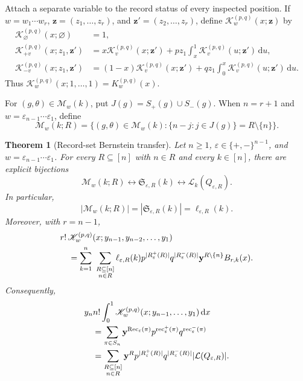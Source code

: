 \documentclass[11pt,letterpaper,reqno]{amsart}
\newtheorem{theorem}{Theorem}[section]
\theoremstyle{definition}
\DeclareMathOperator{\rec}{rec}
\newcommand{\dd}{\,\mathrm{d}}
\newcommand{\eps}{\varepsilon}
\begin{document}
Attach a separate variable to the record status of every inspected position.
If \(w=w_1\cdots w_r\), \(\mathbf z=(z_1,\ldots,z_r)\), and
\(\mathbf z'=(z_2,\ldots,z_r)\), define
\(\mathscr K_w^{(p,q)}(x;\mathbf z)\) by
\begin{align*}
\mathscr K_\varnothing^{(p,q)}(x;\varnothing)&=1,\\
\mathscr K_{+v}^{(p,q)}(x;z_1,\mathbf z')
 &=x\mathscr K_v^{(p,q)}(x;\mathbf z')
   +p z_1\int_x^1\mathscr K_v^{(p,q)}(u;\mathbf z')\dd u,\\
\mathscr K_{-v}^{(p,q)}(x;z_1,\mathbf z')
 &=(1-x)\mathscr K_v^{(p,q)}(x;\mathbf z')
   +q z_1\int_0^x\mathscr K_v^{(p,q)}(u;\mathbf z')\dd u.
\end{align*}
Thus \(\mathscr K_w^{(p,q)}(x;1,\ldots,1)=K_w^{(p,q)}(x)\).

For \((g,\theta)\in\mathcal M_w(k)\), put
\(J(g)=S_+(g)\cup S_-(g)\).  When \(n=r+1\) and
\(w=\eps_{n-1}\cdots\eps_1\), define
\[
\mathcal M_w(k;R)
 =\bigl\{(g,\theta)\in\mathcal M_w(k):
          \{n-j:j\in J(g)\}=R\setminus\{n\}\bigr\}.
\]

\begin{theorem}[Record-set Bernstein transfer]
\label{thm:record-set-master-transfer}
Let \(n\ge1\), \(\eps\in\{+,-\}^{n-1}\), and
\(w=\eps_{n-1}\cdots\eps_1\).  For every \(R\subseteq[n]\) with \(n\in R\)
and every \(k\in[n]\), there are explicit bijections
\[
\mathcal M_w(k;R)
 \longleftrightarrow \mathfrak S_{\eps,R}(k)
 \longleftrightarrow \mathcal L_k(Q_{\eps,R}).
\]
In particular,
\[
|\mathcal M_w(k;R)|
 =|\mathfrak S_{\eps,R}(k)|
 =\ell_{\eps,R}(k).
\]
Moreover, with \(r=n-1\),
\begin{align}
&r!\,\mathscr K_w^{(p,q)}
  (x;y_{n-1},y_{n-2},\ldots,y_1) \notag\\
&\quad=
\sum_{k=1}^{n}\ \sum_{\substack{R\subseteq[n]\\n\in R}}
 \ell_{\eps,R}(k)
 p^{|R_\eps^+(R)|}q^{|R_\eps^-(R)|}
 \mathbf y^{R\setminus\{n\}}B_{r,k}(x).
\label{eq:record-set-master-bernstein}
\end{align}
Consequently,
\begin{align}
&y_n n!\int_0^1
 \mathscr K_w^{(p,q)}(x;y_{n-1},\ldots,y_1)\dd x \notag\\
&\quad=
\sum_{\pi\in S_n}
 \mathbf y^{\operatorname{Rec}_\eps(\pi)}
 p^{\rec_\eps^+(\pi)}q^{\rec_\eps^-(\pi)} \notag\\
&\quad=
\sum_{\substack{R\subseteq[n]\\n\in R}}
 \mathbf y^R p^{|R_\eps^+(R)|}q^{|R_\eps^-(R)|}
 |\mathcal L(Q_{\eps,R})|.
\label{eq:record-set-master-integrated}
\end{align}
\end{theorem}
\end{document}
